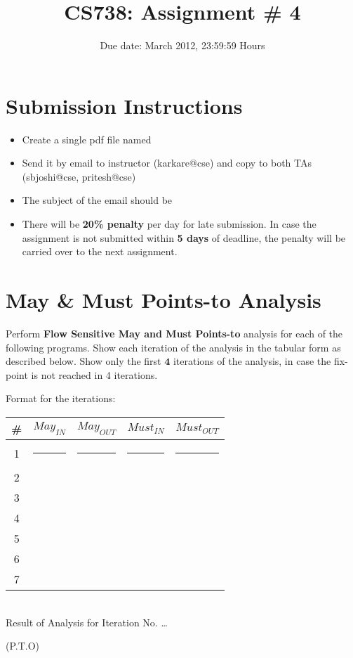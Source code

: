 \documentclass[a4paper,11pt]{article}%
\begin{document}
\title{CS738: Assignment \# 4}
\author{}
\date{Due date: { March 2012, 23:59:59 Hours}}
\maketitle
\section*{Submission Instructions}
\begin{itemize}
\item Create a single pdf file named
\item Send it by email to instructor (karkare@cse) and copy
  to both TAs (sbjoshi@cse, pritesh@cse)
\item The subject of the email should be
\item There will be {\bf 20\% penalty} per day for late
  submission. In case the assignment is not submitted within
  {\bf 5 days} of deadline, the penalty will be carried over to the
  next assignment. 
\end{itemize}
\section{May \& Must Points-to Analysis}
Perform {\bf Flow Sensitive May and Must Points-to} analysis for
each of the following programs. Show each iteration of the
analysis in the tabular form as described below. Show only the first
$\mathbf{4}$ iterations of the analysis, in case the fix-point is
not reached in 4 iterations.

Format for the iterations:

\begin{center}
  \renewcommand{\arraystretch}{1.5}
  \begin{tabular}{|c|c|c|c|c|} \hline
    {\bf \#} & {\bf $May_{IN}$} & {\bf $May_{OUT}$} & {\bf
      $Must_{IN}$} & {\bf $Must_{OUT}$}  \\ \hline \hline
    1 & \rule{25mm}{0pt}& \rule{25mm}{0pt}& \rule{25mm}{0pt}& \rule{25mm}{0pt}\\ \hline
    2 & & & & \\ \hline
    3 & & & & \\ \hline
    4 & & & & \\ \hline
    5 & & & & \\ \hline
    6 & & & & \\ \hline
    7 & & & & \\ \hline
  \end{tabular}

  \ \\
  Result of Analysis for Iteration No. \ldots
\end{center}
\vfill\hfill (P.T.O)
\end{document}
